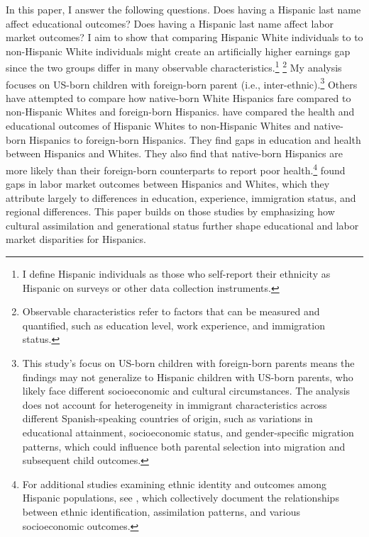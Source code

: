 In this paper, I answer the following questions. Does having a Hispanic last name affect educational outcomes? Does having a Hispanic last name affect labor market outcomes? I aim to show that comparing Hispanic White individuals to to non-Hispanic White individuals might create an artificially higher earnings gap since the two groups differ in many observable characteristics.\footnote{I define Hispanic individuals as those who self-report their ethnicity as Hispanic on surveys or other data collection instruments.} \footnote{Observable characteristics refer to factors that can be measured and quantified, such as education level, work experience, and immigration status.} My analysis focuses on US-born children with foreign-born parent (i.e., inter-ethnic).\footnote{This study's focus on US-born children with foreign-born parents means the findings may not generalize to Hispanic children with US-born parents, who likely face different socioeconomic and cultural circumstances. The analysis does not account for heterogeneity in immigrant characteristics across different Spanish-speaking countries of origin, such as variations in educational attainment, socioeconomic status, and gender-specific migration patterns, which could influence both parental selection into migration and subsequent child outcomes.} Others have attempted to compare how native-born White Hispanics fare compared to non-Hispanic Whites and foreign-born Hispanics. \cites{antman2020ethnic} have compared the health and educational outcomes of Hispanic Whites to non-Hispanic Whites and native-born Hispanics to foreign-born Hispanics. They find gaps in education and health between Hispanics and Whites. They also find that native-born Hispanics are more likely than their foreign-born counterparts to report poor health.\footnote{For additional studies examining ethnic identity and outcomes among Hispanic populations, see \textcite{antman2020ethnic,antmanEthnicAttritionObserved2016,antmanEthnicAttritionObserved2016a,antmanEthnicAttritionAssimilation2020}, which collectively document the relationships between ethnic identification, assimilation patterns, and various socioeconomic outcomes.} \textcite{davilaChangesRelativeEarnings2008} found gaps in labor market outcomes between Hispanics and Whites, which they attribute largely to differences in education, experience, immigration status, and regional differences. This paper builds on those studies by emphasizing how cultural assimilation and generational status further shape educational and labor market disparities for Hispanics.

